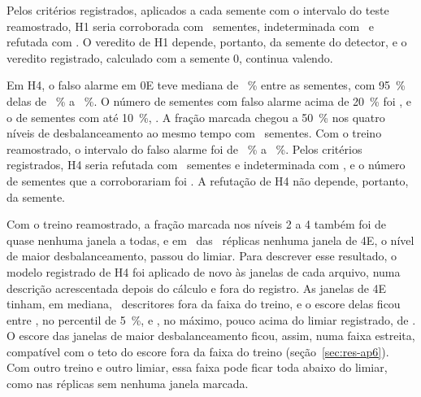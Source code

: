 Pelos critérios registrados, aplicados a cada semente com o intervalo do teste reamostrado, H1 seria corroborada com \apTresVereditoUmCorroborada\ sementes, indeterminada com \apTresVereditoUmIndeterminada\ e refutada com \apTresVereditoUmRefutada. O veredito de H1 depende, portanto, da semente do detector, e o veredito registrado, calculado com a semente 0, continua valendo.

Em H4, o falso alarme em 0E teve mediana de \apTresSementeNivelZeroMed~\% entre as sementes, com \SI{95}{\percent} delas de \apTresSementeNivelZeroPInf~\% a \apTresSementeNivelZeroPSup~\%. O número de sementes com falso alarme acima de \SI{20}{\percent} foi \apTresSementeNivelZeroAcimaVinte, e o de sementes com até \SI{10}{\percent}, \apTresSementeNivelZeroAteDez. A fração marcada chegou a \SI{50}{\percent} nos quatro níveis de desbalanceamento ao mesmo tempo com \apTresSementeNiveisCinquenta\ sementes. Com o treino reamostrado, o intervalo do falso alarme foi de \apTresTreinoInfNivelZero~\% a \apTresTreinoSupNivelZero~\%. Pelos critérios registrados, H4 seria refutada com \apTresVereditoQuatroRefutada\ sementes e indeterminada com \apTresVereditoQuatroIndeterminada, e o número de sementes que a corroborariam foi \apTresVereditoQuatroCorroborada. A refutação de H4 não depende, portanto, da semente.

Com o treino reamostrado, a fração marcada nos níveis 2 a 4 também foi de quase nenhuma janela a todas, e em \descReplicasSemMarcacaoQuatro\ das \apTresReplicas\ réplicas nenhuma janela de 4E, o nível de maior desbalanceamento, passou do limiar. Para descrever esse resultado, o modelo registrado de H4 foi aplicado de novo às janelas de cada arquivo, numa descrição acrescentada depois do cálculo e fora do registro. As janelas de 4E tinham, em mediana, \descForaMedianaQuatro\ descritores fora da faixa do treino, e o escore delas ficou entre \descEscoreCincoPctQuatro, no percentil de \SI{5}{\percent}, e \descEscoreMaxQuatro, no máximo, pouco acima do limiar registrado, de \descLimiarQuatro. O escore das janelas de maior desbalanceamento ficou, assim, numa faixa estreita, compatível com o teto do escore fora da faixa do treino (seção~\ref{sec:res-ap6}). Com outro treino e outro limiar, essa faixa pode ficar toda abaixo do limiar, como nas réplicas sem nenhuma janela marcada.

